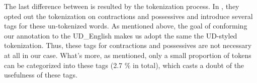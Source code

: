 \documentclass[11pt,letterpaper]{article}
\begin{document}
The last difference between  is resulted by the tokenization process.
In , they opted out the tokenization on contractions and possessives and introduce several tags for these un-tokenized words.
As mentioned above, the goal of conforming our annotation to the UD\_English makes us adopt the same the UD-styled tokenization.
Thus, these tags for contractions and possessives are not necessary at all in our case.
What's more, as  mentioned, only a small proportion of tokens can be categorized into these tags (2.7 \% in total), which casts a doubt of the usefulness of these tags.
\end{document}
